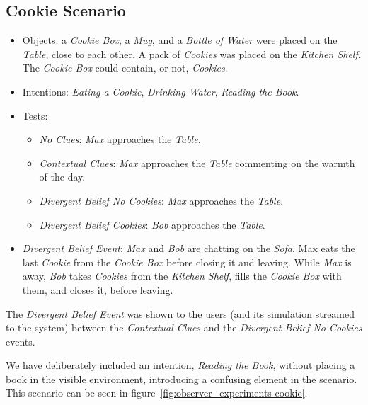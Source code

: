 \subsection{Cookie Scenario}
\begin{itemize}
\item Objects: a \textit{Cookie Box}, a \textit{Mug}, and a \textit{Bottle of Water} were placed on the \textit{Table}, close to each other. A pack of \textit{Cookies} was placed on the \textit{Kitchen Shelf}. The \textit{Cookie Box} could contain, or not, \textit{Cookies}.
\item Intentions: \textit{Eating a Cookie}, \textit{Drinking Water}, \textit{Reading the Book}.
\item Tests:
\begin{itemize}
	\item \textit{No Clues}: \textit{Max} approaches the \textit{Table}.
    \item \textit{Contextual Clues}: \textit{Max} approaches the \textit{Table} commenting on the warmth of the day.
	\item \textit{Divergent Belief No Cookies}: \textit{Max} approaches the \textit{Table}.
	\item \textit{Divergent Belief Cookies}: \textit{Bob} approaches the \textit{Table}.
\end{itemize}
\item  \textit{Divergent Belief Event}:  \textit{Max} and \textit{Bob} are chatting on the \textit{Sofa}. Max eats the last \textit{Cookie} from the \textit{Cookie Box} before closing it and leaving. While \textit{Max} is away, \textit{Bob} takes \textit{Cookies} from the \textit{Kitchen Shelf}, fills the \textit{Cookie Box} with them, and closes it, before leaving.
\end{itemize}

The \textit{Divergent Belief Event} was shown to the users (and its simulation streamed to the system) between the \textit{Contextual Clues} and the \textit{Divergent Belief No Cookies} events. 


We have deliberately included an intention, \textit{Reading the Book}, without placing a book in the visible environment, introducing a confusing element in the scenario. This scenario can be seen in figure~\ref{fig:observer_experiments-cookie}.


